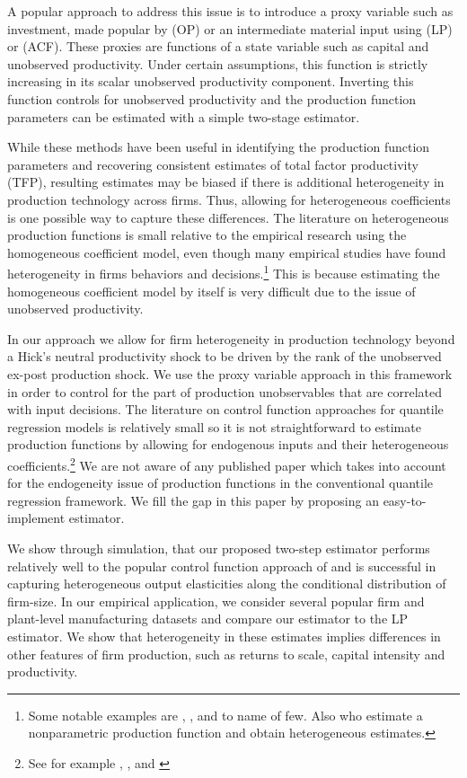 \documentclass[11pt]{article}
\begin{document}
A popular approach to address this issue is to introduce a proxy variable such as investment, made popular by \cite{Olley1996} (OP) or an intermediate material input using \cite{Levinsohn2003} (LP) or \cite{Ackerberg2015} (ACF). These proxies are functions of a state variable such as capital and unobserved productivity. Under certain assumptions, this function is strictly increasing in its scalar unobserved productivity component. Inverting this function controls for unobserved productivity and the production function parameters can be estimated with a simple two-stage estimator.

While these methods have been useful in identifying the production function parameters and recovering consistent estimates of total factor productivity (TFP), resulting estimates may be biased if there is additional heterogeneity in production technology across firms. Thus, allowing for heterogeneous coefficients is one possible way to capture these differences. The literature on heterogeneous production functions is small relative to the empirical research using the homogeneous coefficient model, even though many empirical studies have found heterogeneity in firms behaviors and decisions.\footnote{Some notable examples are \cite*{Kasahara2015}, \cite*{balat}, \cite*{Li2017} and \cite*{mert} to name of few. Also \cite{Gandhi2020} who estimate a nonparametric production function and obtain heterogeneous estimates.} This is because estimating the homogeneous coefficient model by itself is very difficult due to the issue of unobserved productivity. 

In our approach we allow for firm heterogeneity in production technology beyond a Hick's neutral productivity shock to be driven by the rank of the unobserved ex-post production shock.  We use the proxy variable approach in this framework in order to control for the part of production unobservables that are correlated with input decisions. The literature on control function approaches for quantile regression models is relatively small so it is not straightforward to estimate production functions by allowing for endogenous inputs and their heterogeneous coefficients.\footnote{See for example \cite{Chesher2003}, \cite{Ma2006}, \cite{Lee2007} and \cite{2009a}} We are not aware of any published paper which takes into account for the endogeneity issue of production functions in the conventional quantile regression framework. We fill the gap in this paper by proposing an easy-to-implement estimator.

We show through simulation, that our proposed two-step estimator performs relatively well to the popular control function approach of \cite{Levinsohn2003} and is successful in capturing heterogeneous output elasticities along the conditional distribution of firm-size. In our empirical application, we consider several popular firm and plant-level manufacturing datasets and compare our estimator to the LP estimator. We show that heterogeneity in these estimates implies differences in other features of firm production, such as returns to scale, capital intensity and productivity.
\end{document}
